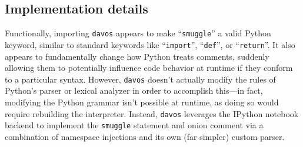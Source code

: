 \documentclass[preprint,12pt,a4paper]{elsarticle}
\begin{document}
\subsection{Implementation details}\label{subsec:implementation}
Functionally, importing \texttt{davos} appears to make ``\texttt{smuggle}'' a valid Python keyword, similar to standard keywords like ``\texttt{import}'', ``\texttt{def}'', or ``\texttt{return}''. It also appears to fundamentally change how Python treats comments, suddenly allowing them to potentially influence code behavior at runtime if they conform to a particular syntax. However, \texttt{davos} doesn't actually modify the rules of Python's parser or lexical analyzer in order to accomplish this---in fact, modifying the Python grammar isn't possible at runtime, as doing so would require rebuilding the interpreter. Instead, \texttt{davos} leverages the IPython notebook backend to implement the \texttt{smuggle} statement and onion comment via a combination of namespace injections and its own (far simpler) custom parser.
\end{document}
